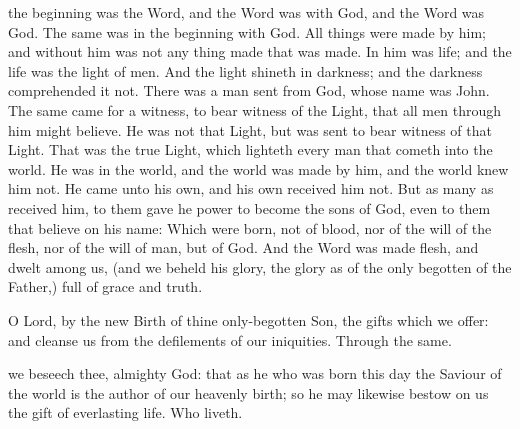 \vspace{-0.25\baselineskip}

 the beginning was the Word, and the Word was with God, and the Word was God. The same was in the beginning with God. All things were made by him; and without him was not any thing made that was made. In him was life; and the life was the light of men. And the light shineth in darkness; and the darkness comprehended it not. There was a man sent from God, whose name was John. The same came for a witness, to bear witness of the Light, that all men through him might believe. He was not that Light, but was sent to bear witness of that Light. That was the true Light, which lighteth every man that cometh into the world. He was in the world, and the world was made by him, and the world knew him not. He came unto his own, and his own received him not. But as many as received him, to them gave he power to become the sons of God, even to them that believe on his name: Which were born, not of blood, nor of the will of the flesh, nor of the will of man, but of God.  And the Word was made flesh, and dwelt among us, (and we beheld his glory, the glory as of the only begotten of the Father,) full of grace and truth.


\vspace{-0.25\baselineskip}

\secret\label{NativityMassIIISecret}
 O Lord, by the new Birth of thine only-begotten Son, the gifts which we offer: and cleanse us from the defilements of our iniquities. Through the same.


\vspace{-0.25\baselineskip}

\postcommunion\label{NativityMassIIIPostcommunion}
 we beseech thee, almighty God: that as he who was born this day the Saviour of the world is the author of our heavenly birth; so he may likewise bestow on us the gift of everlasting life. Who liveth.

